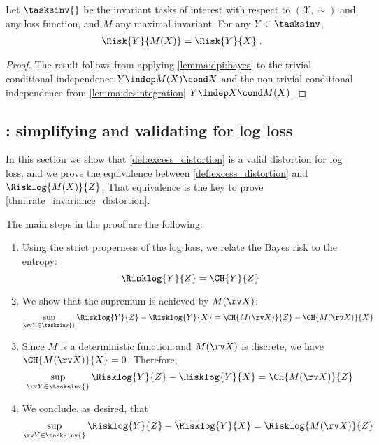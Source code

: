 \documentclass[final]{article}
\begin{document}
\begin{corollary}\label{lemma:Mx_is_X}
	Let $\tasksinv{}$ be the invariant tasks of interest with respect to  $(\mathcal{X},\sim)$ and any loss function, and $M$ any maximal invariant. For any $Y \in \tasksinv$,
	\begin{align}
		\Risk{Y}{M(X)} = \Risk{Y}{X} \;.
	\end{align}
\end{corollary}
\begin{proof}
	The result follows from applying \cref{lemma:dpi:bayes} to the trivial conditional independence $Y \indep M(X) \cond X$ and the non-trivial conditional independence from \cref{lemma:desintegration} $Y \indep X \cond M(X)$.
\end{proof}


\subsection{\texorpdfstring{}{Prop. 1}: simplifying and validating \texorpdfstring{\disttext{}}{invariant distortion} for log loss}
\label{appx:invariant_distortion}


In this section we show that \cref{def:excess_distortion} is a valid distortion for log loss, and we prove the equivalence between \cref{def:excess_distortion} and $\Risklog{M(X)}{Z}$. That equivalence is the key to prove \cref{thm:rate_invariance_distortion}.


The main steps in the proof are the following:
\begin{enumerate}[noitemsep]
\item Using the strict properness of the log loss, we relate the Bayes risk to the entropy:
\begin{equation}
\Risklog{Y}{Z}  =  \CH{Y}{Z} 
\end{equation}
\item We show that the supremum is achieved by $M(\rv X)$:
\begin{equation}
\sup_{\rv Y \in \tasksinv{} } \Risklog{Y}{Z} - \Risklog{Y}{X}  = \CH{M(\rv X)}{Z} - \CH{M(\rv X)}{X}
\end{equation}
\item Since $M$ is a deterministic function and $M(\rv X)$ is discrete, we have $\CH{M(\rv X)}{X}=0$. Therefore,
\begin{equation}
\sup_{\rv Y \in \tasksinv{} } \Risklog{Y}{Z} - \Risklog{Y}{X}  = \CH{M(\rv X)}{Z} 
\end{equation}
\item We conclude, as desired, that
\begin{equation}
\sup_{\rv Y \in \tasksinv{} } \Risklog{Y}{Z} - \Risklog{Y}{X}  = \Risklog{M(\rv X)}{Z} 
\end{equation}
\end{enumerate}
\end{document}
